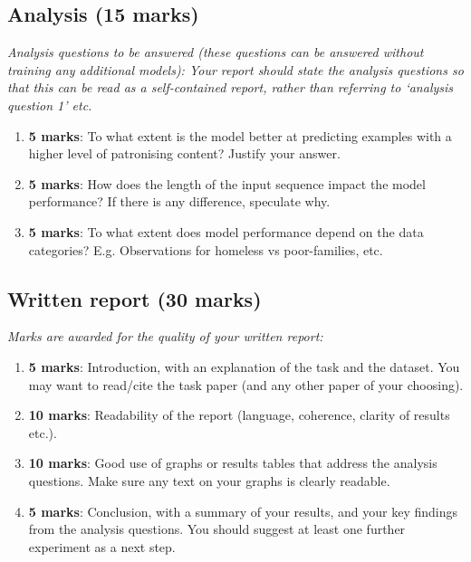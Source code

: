 \documentclass[11pt]{article}
\begin{document}
\subsection{Analysis \textbf{(15 marks)}}

\emph{Analysis questions to be answered (these questions can be answered without training any additional models): Your report should state the analysis questions so that this can be read as a self-contained report, rather than referring to ‘analysis question 1’ etc.}

\begin{enumerate}
    \item \textbf{5 marks}: To what extent is the model better at predicting examples with a higher level of patronising content? Justify your answer.
    \item \textbf{5 marks}: How does the length of the input sequence impact the model performance? If there is any difference, speculate why.
    \item \textbf{5 marks}: To what extent does model performance depend on the data categories? E.g. Observations for homeless vs poor-families, etc.
\end{enumerate}

\subsection{Written report \textbf{(30 marks)}}

\emph{Marks are awarded for the quality of your written report:}

\begin{enumerate}
    \item \textbf{5 marks}: Introduction, with an explanation of the task and the
    dataset. You may want to read/cite the task paper (and any other paper of
    your choosing).
    \item \textbf{10 marks}: Readability of the report (language, coherence, clarity of
    results etc.).
    \item \textbf{10 marks}: Good use of graphs or results tables that address the
    analysis questions. Make sure any text on your graphs is clearly readable.
    \item \textbf{5 marks}: Conclusion, with a summary of your results, and your key
    findings from the analysis questions. You should suggest at least one further
    experiment as a next step.
\end{enumerate}
\end{document}
